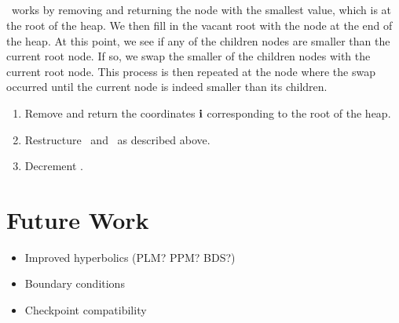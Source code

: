 \subsection{\RMVNODE}
\RMVNODE~works by removing and returning the node with the smallest value, which is at the root of the heap. We then fill in the vacant root with the node at the end of the heap. At this point, we see if any of the children nodes are smaller than the current root node. If so, we swap the smaller of the children nodes with the current root node. This process is then repeated at the node where the swap occurred until the current node is indeed smaller than its children.
\begin{enumerate}
\item Remove and return the coordinates ${\bf i}$ corresponding to the root of the heap.
\item Restructure \heap~and \heaploc~as described above.
\item Decrement \numtent.
\end{enumerate}
\section{Future Work}
\begin{itemize}
\item Improved hyperbolics (PLM? PPM? BDS?)
\item Boundary conditions
\item Checkpoint compatibility
\end{itemize}
